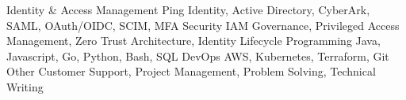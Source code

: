 \begin{cvskills}
  \cvskill
    {Identity \& Access Management}
    {Ping Identity, Active Directory, CyberArk, SAML, OAuth/OIDC, SCIM, MFA}
  \cvskill
    {Security}
    {IAM Governance, Privileged Access Management, Zero Trust Architecture, Identity Lifecycle}
  \cvskill
    {Programming}
    {Java, Javascript, Go, Python, Bash, SQL}
  \cvskill
    {DevOps}
    {AWS, Kubernetes, Terraform, Git}
  \cvskill
    {Other}
    {Customer Support, Project Management, Problem Solving, Technical Writing}
\end{cvskills}